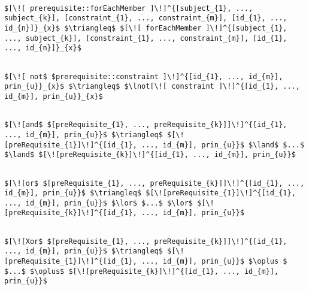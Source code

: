 \lstset{mathescape, language=AST}  
\begin{lstlisting}[frame=single, caption={Prerequisite Translation {$\colon$} ForEachMember},label={lst:transpreRequisiteForEachMember}]

$[\![ prerequisite::forEachMember ]\!]^{[subject_{1}, ..., subject_{k}], [constraint_{1}, ..., constraint_{m}], [id_{1}, ..., id_{n}]}_{x}$ $\triangleq$ $[\![ forEachMember ]\!]^{[subject_{1}, ..., subject_{k}], [constraint_{1}, ..., constraint_{m}], [id_{1}, ..., id_{n}]}_{x}$ 	
\end{lstlisting}

\lstset{mathescape, language=AST}  
\begin{lstlisting}[frame=single, caption={Prerequisite Translation {$\colon$} Not Constraint},label={lst:transpreRequisiteNotConstraint}]

$[\![ not$ $prerequisite::constraint ]\!]^{[id_{1}, ..., id_{m}], prin_{u}}_{x}$ $\triangleq$ $\lnot[\![ constraint ]\!]^{[id_{1}, ..., id_{m}], prin_{u}}_{x}$ 
\end{lstlisting}


\lstset{mathescape, language=AST}  
\begin{lstlisting}[frame=single, caption={Prerequisite Translation {$\colon$} Conjunction },label={lst:transpreRequisiteAndPrqs}]

$[\![and$ $[preRequisite_{1}, ..., preRequisite_{k}]]\!]^{[id_{1}, ..., id_{m}], prin_{u}}$ $\triangleq$ $[\![preRequisite_{1}]\!]^{[id_{1}, ..., id_{m}], prin_{u}}$ $\land$ $...$ $\land$ $[\![preRequisite_{k}]\!]^{[id_{1}, ..., id_{m}], prin_{u}}$

\end{lstlisting}
\lstset{mathescape, language=AST}  
\begin{lstlisting}[frame=single, caption={Prerequisite Translation {$\colon$} Inclusive Disjunction},label={lst:transpreRequisiteOrPrqs}]

$[\![or$ $[preRequisite_{1}, ..., preRequisite_{k}]]\!]^{[id_{1}, ..., id_{m}], prin_{u}}$ $\triangleq$ $[\![preRequisite_{1}]\!]^{[id_{1}, ..., id_{m}], prin_{u}}$ $\lor$ $...$ $\lor$ $[\![preRequisite_{k}]\!]^{[id_{1}, ..., id_{m}], prin_{u}}$

\end{lstlisting}
\lstset{mathescape, language=AST}  
\begin{lstlisting}[frame=single, caption={Prerequisite Translation {$\colon$} Exclusive Disjunction},label={lst:transpreRequisiteXorPrqs}]

$[\![Xor$ $[preRequisite_{1}, ..., preRequisite_{k}]]\!]^{[id_{1}, ..., id_{m}], prin_{u}}$ $\triangleq$ $[\![preRequisite_{1}]\!]^{[id_{1}, ..., id_{m}], prin_{u}}$ $\oplus $ $...$ $\oplus$ $[\![preRequisite_{k}]\!]^{[id_{1}, ..., id_{m}], prin_{u}}$

\end{lstlisting}


